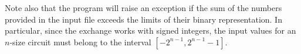 \documentclass[12pt]{article}
\begin{document}
Note also that the program will raise an exception if the sum of the numbers provided in the input file exceeds the limits of their binary representation. In particular, since the exchange works with signed integers, the input values for an $n$-size circuit must belong to the interval $[-2^{n-1}, 2^{n-1}-1]$. 



\end{document}
